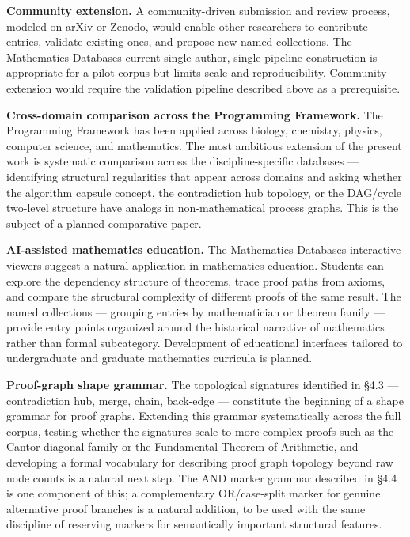 \documentclass[
  11pt]{article}
\begin{document}
\textbf{Community extension.} A community-driven submission and review
process, modeled on arXiv or Zenodo, would enable other researchers to
contribute entries, validate existing ones, and propose new named
collections. The Mathematics Database\textquotesingle s current
single-author, single-pipeline construction is appropriate for a pilot
corpus but limits scale and reproducibility. Community extension would
require the validation pipeline described above as a prerequisite.

\textbf{Cross-domain comparison across the Programming Framework.} The
Programming Framework has been applied across biology, chemistry,
physics, computer science, and mathematics. The most ambitious extension
of the present work is systematic comparison across the
discipline-specific databases --- identifying structural regularities
that appear across domains and asking whether the algorithm capsule
concept, the contradiction hub topology, or the DAG/cycle two-level
structure have analogs in non-mathematical process graphs. This is the
subject of a planned comparative paper.

\textbf{AI-assisted mathematics education.} The Mathematics
Database\textquotesingle s interactive viewers suggest a natural
application in mathematics education. Students can explore the
dependency structure of theorems, trace proof paths from axioms, and
compare the structural complexity of different proofs of the same
result. The named collections --- grouping entries by mathematician or
theorem family --- provide entry points organized around the historical
narrative of mathematics rather than formal subcategory. Development of
educational interfaces tailored to undergraduate and graduate
mathematics curricula is planned.

\textbf{Proof-graph shape grammar.} The topological signatures
identified in §4.3 --- contradiction hub, merge, chain, back-edge ---
constitute the beginning of a shape grammar for proof graphs. Extending
this grammar systematically across the full corpus, testing whether the
signatures scale to more complex proofs such as the Cantor diagonal
family or the Fundamental Theorem of Arithmetic, and developing a formal
vocabulary for describing proof graph topology beyond raw node counts is
a natural next step. The AND marker grammar described in §4.4 is one
component of this; a complementary OR/case-split marker for genuine
alternative proof branches is a natural addition, to be used with the
same discipline of reserving markers for semantically important
structural features.
\end{document}
